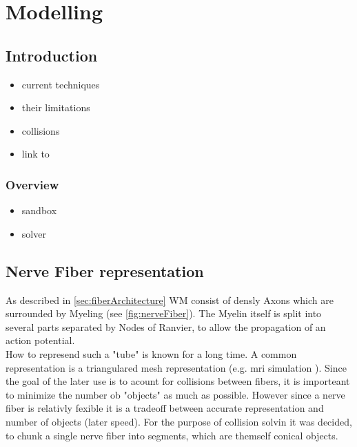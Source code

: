 \setcounter{chapter}{4}
\chapter{Modelling}
\label{chap:modelling}
% 
\section{Introduction}
\cite{Balls2009}
% 
\begin{itemize}
    \item current techniques
    \item their limitations
    \item collisions
    \item link to \cite{matuschke2019}
\end{itemize}
% 
\subsection{Overview}
% 
\begin{itemize}
    \item sandbox
    \item solver
\end{itemize}
% 
\section{Nerve Fiber representation}
% 
As described in \cref{sec:fiberArchitecture} \ac{WM} consist of densly Axons which are surrounded by Myeling (see \cref{fig:nerveFiber}).
The Myelin itself is split into several parts separated by Nodes of Ranvier, to allow the propagation of an action potential.\\
% 
How to represend such a "tube" is known for a long time. A common representation is a triangulared mesh representation (e.g. mri simulation \dummy). Since the goal of the later use is to acount for collisions between fibers, it is importeant to minimize the number ob "objects" as much as possible. However since a nerve fiber is relativly fexible it is a tradeoff between accurate representation and number of objects (later speed).
% 
For the purpose of collision solvin it was decided, to chunk a single nerve fiber into segments, which are themself conical objects.

